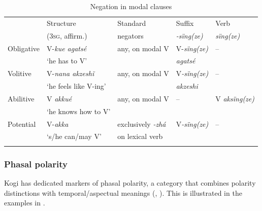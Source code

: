 \documentclass[output=paper,colorlinks,citecolor=brown]{langscibook}
\begin{document}
\begin{table}\small 
\begin{tabularx}{\textwidth}{llXll} 
    \lsptoprule
                    & {Structure}               & {Standard}            & {Suffix}                      & {Verb}\\
                    & {(3\textsc{sg,} affirm.)} & {negators}            & {\textit{-sïng(ze)}}          & {\textit{sïng(ze)}}\\
    \midrule 
    {Obligative}    & {V-\textit{kue agatsé}}   & {any, on modal V}     & {V-\textit{sïng(ze) }}        & {–}\\
                    & {‘he has to V’}           &                       & \textit{agatsé}               & \\
    {Volitive}      & {V-\textit{nana akzesh\~{i}}} & {any, on modal V} & {V\textit{{}-sïng(ze)}}       & {–}\\
                    & {‘he feels like V-ing’}   &                       & \textit{akzeshi}              &\\
    {Abilitive}     & {V \textit{akkué}}        & {any, on modal V}     & {–}                           & {V \textit{aksïng(ze)}}\\
                    & {‘he knows how to V’}     &                       &                               &\\
    {Potential}     & {V-\textit{akka}}         & {exclusively \textit{-zhá}} & {V\textit{{}-sïng(ze)}} & {–}\\
                    & {‘s/he can/may V’}        & on lexical verb &&\\
    \lspbottomrule
\end{tabularx}
\caption{Negation in modal clauses}
\label{tab:kog:5}
\end{table}

\subsubsection{Phasal polarity}\label{sec:kog:2.1.5}

Kogi has dedicated markers of phasal polarity, a category that combines polarity distinctions with temporal/aspectual meanings (\citealt{Auwera1998}, \citealt{Kramer2017}). This is illustrated in the examples in . 
\end{document}
